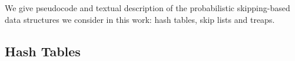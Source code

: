 We give pseudocode and textual description of the probabilistic skipping-based data structures we consider in this work: hash tables, skip lists and treaps.

\subsection{Hash Tables}
\label{prelim:ht}

\begin{figure*}[!htbp]
            \centering
            \begin{pchstack}[boxed,center,space=0.5em]
                \begin{pcvstack}[space=1ex]
                        

\end{pcvstack}
\end{pchstack}
\end{figure*}
